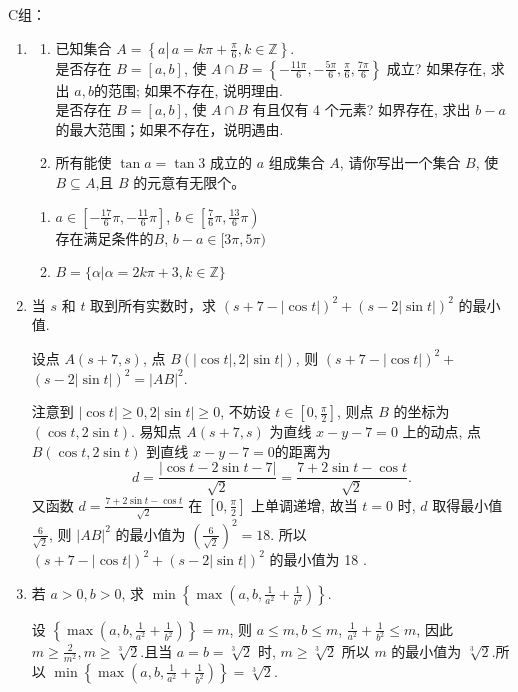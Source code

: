 C组：
\begin{enumerate}
\item
\begin{enumerate}
\item 已知集合 $A=\left\{a \left\lvert\, a=k \pi+\frac{\pi}{6}\right., k \in \mathbb{Z}\right\}$.\\
是否存在 $B=[a, b]$, 使 $A \cap B=\left\{-\frac{11 \pi}{6},-\frac{5 \pi}{6}, \frac{\pi}{6}, \frac{7 \pi}{6}\right\}$ 成立? 如果存在, 求出 $a, b$的范围; 如果不存在, 说明理由.\\
是否存在 $B=[a, b]$, 使 $A \cap B$ 有且仅有 4 个元素? 如界存在, 求出 $b-a$ 的最大范围；如果不存在，说明遇由.
\item 所有能使 $\tan a=\tan 3$ 成立的 $a$ 组成集合 $A$, 请你写出一个集合 $B$, 使 $B \subseteq A$,且 $B$ 的元意有无限个。
\end{enumerate}
\begin{jieda}
    \begin{enumerate}
        \item {}  $a \in\left[-\frac{17}{6} \pi,-\frac{11}{6} \pi\right]$, $b \in\left[\frac{7}{6} \pi, \frac{13}{6} \pi\right)$ \\
         存在满足条件的$B$, $b-a \in[3 \pi, 5 \pi)$
        \item $B=\{\alpha|\alpha=2k\pi+3,k\in\mathbb{Z}\}$
    \end{enumerate}
\end{jieda}

\item 当 $s$ 和 $t$ 取到所有实数时，求 $(s+7-|\cos t|)^2+(s-2|\sin t|)^2$ 的最小值.
\begin{jieda}
设点 $A(s+7, s)$, 点 $B(|\cos t|, 2|\sin t|)$, 则 $(s+7-|\cos t|)^2+$ $(s-2|\sin t|)^2=|A B|^2$.

注意到 $|\cos t| \geqslant 0,2|\sin t| \geqslant 0$, 不妨设 $t \in\left[0, \frac{\pi}{2}\right]$, 则点 $B$ 的坐标为 $(\cos t, 2 \sin t)$.
易知点 $A(s+7, s)$ 为直线 $x-y-7=0$ 上的动点, 点 $B(\cos t, 2 \sin t)$ 到直线 $x-y-7=0$的距离为
$$
d=\frac{|\cos t-2 \sin t-7|}{\sqrt{2}}=\frac{7+2 \sin t-\cos t}{\sqrt{2}} .
$$
又函数 $d=\frac{7+2 \sin t-\cos t}{\sqrt{2}}$ 在 $\left[0, \frac{\pi}{2}\right]$ 上单调递增, 故当 $t=0$ 时, $d$ 取得最小值 $\frac{6}{\sqrt{2}}$, 则 $|A B|^2$ 的最小值为 $\left(\frac{6}{\sqrt{2}}\right)^2=18$.
所以 $(s+7-|\cos t|)^2+(s-2|\sin t|)^2$ 的最小值为 18 .
\end{jieda}

\item 若 $a>0, b>0$, 求 $\min \left\{\max \left(a, b, \frac{1}{a^2}+\frac{1}{b^2}\right)\right\}$.
\begin{jieda}
设 $\left\{\max \left(a, b, \frac{1}{a^2}+\frac{1}{b^2}\right)\right\}=m$, 则 $a \leqslant m, b \leqslant m$, $\frac{1}{a^2}+\frac{1}{b^2} \leqslant m$, 因此 $m \geqslant \frac{2}{m^2}, m \geqslant \sqrt[3]{2}$.且当 $a=b=\sqrt[3]{2}$ 时, $m \geqslant \sqrt[3]{2}$ 所以 $m$ 的最小值为 $\sqrt[3]{2}$.所以 $\min \left\{\max \left(a, b, \frac{1}{a^2}+\frac{1}{b^2}\right)\right\}=\sqrt[3]{2}$.
\end{jieda}

\end{enumerate}


